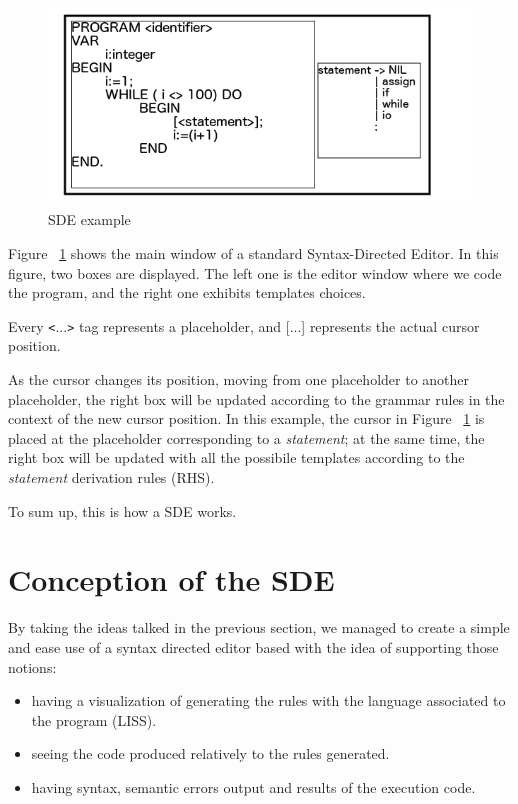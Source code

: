 \documentclass[
  oneside,
  11pt, a4paper,
  footinclude=true,
  headinclude=true,
  cleardoublepage=empty
]{scrbook}
\begin{document}
\begin{figure}[h!]
  \centering
    \includegraphics[width=1\textwidth]{img/SDE.png}
    \caption{SDE example}
    \label{fig:SDE}
\end{figure}


Figure ~\ref{fig:SDE} shows the main window of a standard Syntax-Directed Editor.
In this figure, two boxes are displayed.
The left one is the editor window where we code the program, and the right one exhibits templates choices.

Every \texttt{<}...\texttt{>}  tag represents a placeholder, and [...] represents the actual cursor position.

As the cursor changes its position, moving from one placeholder to another placeholder, the right box will be updated according to the grammar rules in the context of the new cursor position.
In this example, the cursor in Figure ~\ref{fig:SDE} is placed at the placeholder corresponding to a \textit{statement}; at the same time, the right box will be updated with all the possibile templates according to the \textit{statement} derivation rules (RHS).

To sum up, this is how a SDE works.

\section{Conception of the SDE}

By taking the ideas talked in the previous section, we managed to create a simple and ease use of a syntax directed editor based with the idea of supporting those notions:

\begin{itemize}
\item having a visualization of generating the rules with the language associated to the program (LISS).
\item seeing the code produced relatively to the rules generated.
\item having syntax, semantic errors output and results of the execution code.
\end{itemize}
\end{document}
